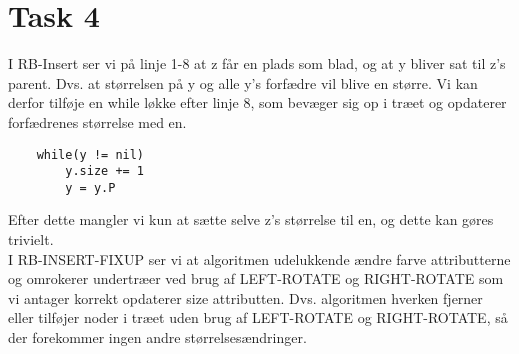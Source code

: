 \section{Task 4}
I RB-Insert ser vi på linje 1-8 at z får en plads som blad, og at y bliver sat til z's parent. Dvs. at størrelsen på y og alle y's forfædre vil blive en større. Vi kan derfor tilføje en while løkke efter linje 8, som bevæger sig op i træet og opdaterer forfædrenes størrelse med en.
\begin{lstlisting}
	while(y != nil)
		y.size += 1
		y = y.P
\end{lstlisting}
Efter dette mangler vi kun at sætte selve z's størrelse til en, og dette kan gøres trivielt.\\

I RB-INSERT-FIXUP ser vi at algoritmen udelukkende ændre farve attributterne og omrokerer undertræer ved brug af LEFT-ROTATE og RIGHT-ROTATE som vi antager korrekt opdaterer size attributten. Dvs. algoritmen hverken fjerner eller tilføjer noder i træet uden brug af LEFT-ROTATE og RIGHT-ROTATE, så der forekommer ingen andre størrelsesændringer.
